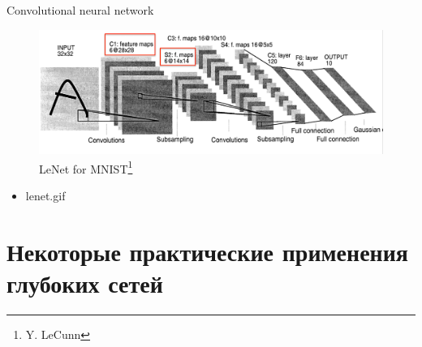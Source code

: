 \documentclass[10pt]{beamer}
\begin{document}
\begin{frame}{Convolutional neural network}

\begin{figure}[h!]
  \centering
  \includegraphics[width=1\textwidth]{images/cnn.png}
  \caption{LeNet for MNIST\footnote{Y. LeCunn}}
\end{figure}

\begin{itemize}
	\item lenet.gif
\end{itemize}

\end{frame}

\section{Некоторые практические применения глубоких сетей}
\end{document}
